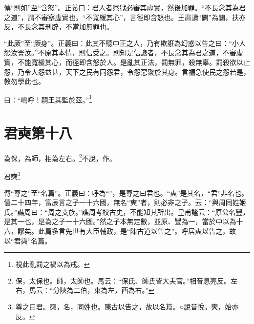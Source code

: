 {\noindent\zhuan{}\fzbyks 傳“則如”至“含怒”。正義曰：君人者察獄必審其虛實，然後加罪。“不長念其為君之道”，謂不審察虛實也。“不寬緩其心”，言徑即含怒也。王肅讀“闢”為闢，扶亦反，不長念其刑辟，不當加無罪也。 \par}

{\noindent\shu{}\fzkt “此厥”至“厥身”。正義曰：此其不聽中正之人，乃有欺誑為幻惑以告之曰：“小人怨汝詈汝。”不原其本情，則信受之。則知是信讒者，不長念其為君之道，不審虛實，不能寬緩其心，而徑即含怒於人。是亂其正法，罰無罪，殺無辜。罰殺欲以止怨，乃令人怨益甚，天下之民有同怨君，令怨惡聚於其身。言褊急使民之怨若是，教勿學此也。 \par}

曰：“嗚呼！嗣王其監於茲。”\footnote{視此亂罰之禍以為戒。}

\section{君奭第十八}


為保，為師，相為左右。\footnote{保，太保也。師，太師也。馬云：“保氏、師氏皆大夫官。”相音息亮反。左右，馬云：“分陝為二伯，東為左，西為右。”}不說，作。

君奭\footnote{尊之曰君。奭，名，同姓也。陳古以告之，故以名篇。○說音悅。奭，始亦反。}


{\noindent\zhuan{}\fzbyks 傳“尊之”至“名篇”。正義曰：呼為“”，是尊之曰君也。“奭”是其名，“君”非名也。僖二十四年，富辰言之子一十六國，無名“奭”者，則必非之子。云：“與周同姓姬氏。”譙周曰：“周之支族。”譙周考校古史，不能知其所出。皇甫謐云：“原公名豐，是其一也，是為之子一十六國。”然之子本無定數，並原、豐為一，當於中以為十六，謬矣。此篇多言先世有大臣輔政，是“陳古道以告之”。呼居奭以告之，故以“君奭”名篇。 \par}

